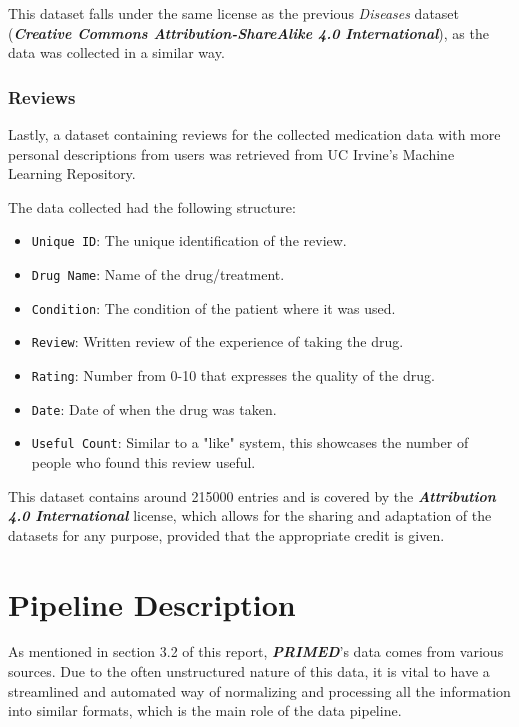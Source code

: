 \documentclass[sigconf]{acmart}
\begin{document}
This dataset falls under the same license as the previous \textit{Diseases} dataset (\textit{\textbf{Creative Commons Attribution-ShareAlike 4.0 International}}), as the data was collected in a similar way.

\subsubsection{Reviews}

Lastly, a dataset containing reviews for the collected medication data with more personal descriptions from users\cite{reviews_dataset} was retrieved from UC Irvine's Machine Learning Repository\cite{irvine}.

The data collected had the following structure:
\begin{itemize}
	\item {\texttt{Unique ID}}: The unique identification of the review.
	\item {\texttt{Drug Name}}: Name of the drug/treatment.
	\item {\texttt{Condition}}: The condition of the patient where it was used.
	\item {\texttt{Review}}: Written review of the experience of taking the drug.
	\item {\texttt{Rating}}: Number from 0-10 that expresses the quality of the drug.
    \item {\texttt{Date}}: Date of when the drug was taken.
    \item {\texttt{Useful Count}}: Similar to a "like" system, this showcases the number of people who found this review useful.
\end{itemize}

This dataset contains around 215000 entries and is covered by the \textit{\textbf{Attribution 4.0 International}}\cite{ccfour} license, which allows for the sharing and adaptation of the datasets for any purpose, provided that the appropriate credit is given.

\section{Pipeline Description}

As mentioned in section 3.2 of this report, \textit{\textbf{PRIMED}}'s data comes from various sources. Due to the often unstructured nature of this data, it is vital to have a streamlined and automated way of normalizing and processing all the information into similar formats, which is the main role of the data pipeline.
\end{document}
